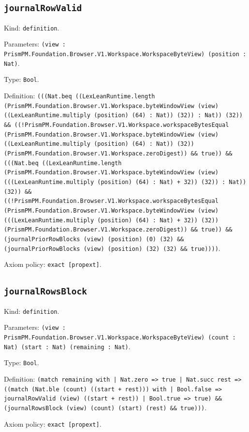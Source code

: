 \documentclass[11pt]{article}
\begin{document}
\subsection*{\texttt{journalRowValid}}
\noindent Kind: \texttt{definition}.\par
\noindent Parameters: \texttt{(view : PrismPM.Foundation.Browser.V1.Workspace.WorkspaceByteView) (position : Nat)}.\par
\noindent Type: \texttt{Bool}.\par
\noindent Definition: \texttt{(((Nat.beq ((LexLeanRuntime.length (PrismPM.Foundation.Browser.V1.Workspace.byteWindowView (view) ((LexLeanRuntime.multiply (position) (64) : Nat)) (32)) : Nat)) (32)) \&\& ((!PrismPM.Foundation.Browser.V1.Workspace.workspaceBytesEqual (PrismPM.Foundation.Browser.V1.Workspace.byteWindowView (view) ((LexLeanRuntime.multiply (position) (64) : Nat)) (32)) (PrismPM.Foundation.Browser.V1.Workspace.zeroDigest)) \&\& true)) \&\& (((Nat.beq ((LexLeanRuntime.length (PrismPM.Foundation.Browser.V1.Workspace.byteWindowView (view) (((LexLeanRuntime.multiply (position) (64) : Nat) + 32)) (32)) : Nat)) (32)) \&\& ((!PrismPM.Foundation.Browser.V1.Workspace.workspaceBytesEqual (PrismPM.Foundation.Browser.V1.Workspace.byteWindowView (view) (((LexLeanRuntime.multiply (position) (64) : Nat) + 32)) (32)) (PrismPM.Foundation.Browser.V1.Workspace.zeroDigest)) \&\& true)) \&\& (journalPriorRowBlocks (view) (position) (0) (32) \&\& (journalPriorRowBlocks (view) (position) (32) (32) \&\& true))))}.\par
\noindent Axiom policy: \texttt{exact [propext]}.\par
\subsection*{\texttt{journalRowsBlock}}
\noindent Kind: \texttt{definition}.\par
\noindent Parameters: \texttt{(view : PrismPM.Foundation.Browser.V1.Workspace.WorkspaceByteView) (count : Nat) (start : Nat) (remaining : Nat)}.\par
\noindent Type: \texttt{Bool}.\par
\noindent Definition: \texttt{(match remaining with | Nat.zero => true | Nat.succ rest => ((match (Nat.ble (count) ((start + rest))) with | Bool.false => journalRowValid (view) ((start + rest)) | Bool.true => true) \&\& (journalRowsBlock (view) (count) (start) (rest) \&\& true)))}.\par
\noindent Axiom policy: \texttt{exact [propext]}.\par
\end{document}
